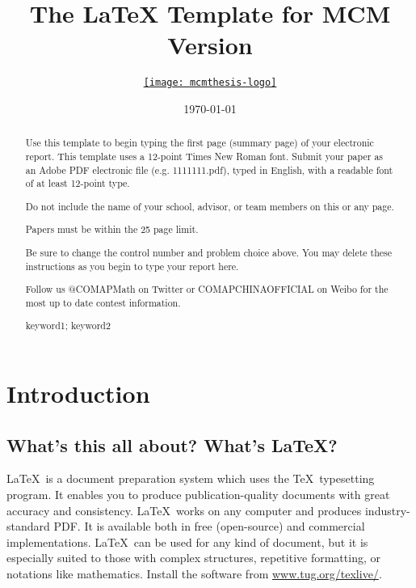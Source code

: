 \documentclass{mcmthesis}
\title{The \LaTeX{} Template for MCM Version \MCMversion}
\author{\small \href{https://www.latexstudio.net/}
  {\texttt{[image: mcmthesis-logo]}}}
\date{\today}
\begin{document}
\begin{abstract}
	Use this template to begin typing the first page (summary page) of your electronic report. This template uses a 12-point Times New Roman font. Submit your paper as an Adobe PDF electronic file (e.g. 1111111.pdf), typed in English, with a readable font of at least 12-point type.

	Do not include the name of your school, advisor, or team members on this or any page.

	Papers must be within the 25 page limit.

	Be sure to change the control number and problem choice above.
	You may delete these instructions as you begin to type your report here.

	Follow us @COMAPMath on Twitter or COMAPCHINAOFFICIAL on Weibo for the most up to date contest information.

	\begin{keywords}
		keyword1; keyword2
	\end{keywords}
\end{abstract}
\maketitle
\section{Introduction}
\subsection{What's this all about? What's \LaTeX?}
\LaTeX\ is a document preparation system which uses the \TeX\
typesetting program. It enables you to produce
publication-quality documents with great accuracy and
consistency. \LaTeX\ works on any computer and produces
industry-standard PDF. It is available both in free (open-source)
and commercial implementations. \LaTeX\ can be used for any kind
of document, but it is especially suited to those with complex
structures, repetitive formatting, or notations like
mathematics. Install the software from
\url{www.tug.org/texlive/}.
\end{document}

